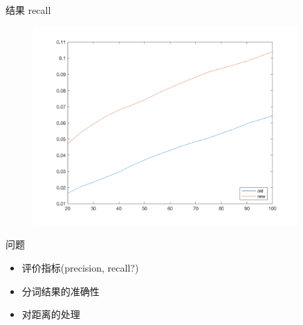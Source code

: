 \documentclass{beamer}
\begin{document}
  \begin{frame}{结果}
    recall
    \begin{figure}
      \centering\includegraphics[width=0.9\textwidth]{Nov-9/result_2.png}
    \end{figure}
  \end{frame}
  \begin{frame}{问题}
    \begin{itemize}
      \item 评价指标(precision, recall?)
      \item 分词结果的准确性
      \item 对距离的处理
    \end{itemize}
  \end{frame}
\end{document}
